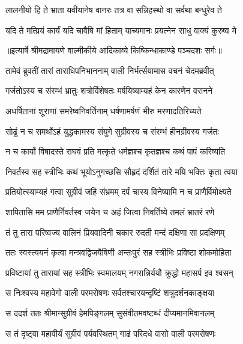\twolineshloka
{लालनीयो हि ते भ्राता यवीयानेष वानरः}
{तत्र वा सन्निहस्थो वा सर्वथा बन्धुरेव ते} %

\twolineshloka
{यदि ते मत्प्रियं कार्यं यदि चावैषि मां हिताम्}
{याच्यमानः प्रयत्नेन साधु वाक्यं कुरुष्व मे} %


{॥इत्यार्षे श्रीमद्रामायणे वाल्मीकीये आदिकाव्ये किष्किन्धाकाण्डे पञ्चदशः सर्गः॥}


\twolineshloka
{तामेवं ब्रुवतीं तारां ताराधिपनिभाननाम्}
{वाली निर्भर्त्सयामास वचनं चेदमब्रवीत्} %

\twolineshloka
{गर्जतोऽस्य च संरम्भं भ्रातुः शत्रोर्विशेषतः}
{मर्षयिष्याम्यहं केन कारणेन वरानने} %

\twolineshloka
{अधर्षितानां शूराणां समरेष्वनिवर्तिनाम्}
{धर्षणामर्षणं भीरु मरणादतिरिच्यते} %

\twolineshloka
{सोढुं न च समर्थोऽहं युद्धकामस्य संयुगे}
{सुग्रीवस्य च संरम्भं हीनग्रीवस्य गर्जतः} %

\twolineshloka
{न च कार्यो विषादस्ते राघवं प्रति मत्कृते}
{धर्मज्ञश्च कृतज्ञश्च कथं पापं करिष्यति} %

\twolineshloka
{निवर्तस्व सह स्त्रीभिः कथं भूयोऽनुगच्छसि}
{सौहृदं दर्शितं तारे मयि भक्तिः कृता त्वया} %

\twolineshloka
{प्रतियोत्स्याम्यहं गत्वा सुग्रीवं जहि संभ्रमम्}
{दर्पं चास्य विनेष्यामि न च प्राणैर्विमोक्ष्यते} %

\twolineshloka
{शापितासि मम प्राणैर्निवर्तस्व जयेन च}
{अहं जित्वा निवर्तिष्ये तमलं भ्रातरं रणे} %

\twolineshloka
{तं तु तारा परिष्वज्य वालिनं प्रियवादिनी}
{चकार रुदती मन्दं दक्षिणा सा प्रदक्षिणम्} %

\twolineshloka
{ततः स्वस्त्ययनं कृत्वा मन्त्रवद्विजयैषिणी}
{अन्तःपुरं सह स्त्रीभिः प्रविष्टा शोकमोहिता} %

\twolineshloka
{प्रविष्टायां तु तारायां सह स्त्रीभिः स्वमालयम्}
{नगरान्निर्ययौ क्रुद्धो महासर्प इव श्वसन्} %

\twolineshloka
{स निःश्वस्य महावेगो वाली परमरोषणः}
{सर्वतश्चारयन्दृष्टिं शत्रुदर्शनकाङ्क्षया} %

\twolineshloka
{स ददर्श ततः श्रीमान्सुग्रीवं हेमपिङ्गलम्}
{सुसंवीतमवष्टब्धं दीप्यमानमिवानलम्} %

\twolineshloka
{स तं दृष्ट्वा महावीर्यं सुग्रीवं पर्यवस्थितम्}
{गाढं परिदधे वासो वाली परमरोषणः} %

